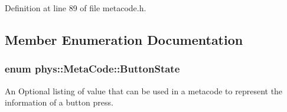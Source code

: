 Definition at line 89 of file metacode.h.



\subsection{Member Enumeration Documentation}
\hypertarget{classphys_1_1MetaCode_a2fdfb26b3e50ceb0ccc60bfc4c3d6ac2}{
\subsubsection[{ButtonState}]{\setlength{\rightskip}{0pt plus 5cm}enum {\bf phys::MetaCode::ButtonState}}}
\label{da/dc9/classphys_1_1MetaCode_a2fdfb26b3e50ceb0ccc60bfc4c3d6ac2}


An Optional listing of value that can be used in a metacode to represent the information of a button press. 

